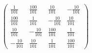\[ \left(\begin{array}{cccc}  \frac{ 1 }{101}  &  \frac{ 100 }{ 101 }
&  \frac{ 10 }{ 101 }  &  -\frac{ 10 }{ 101 }  \\  \frac{ 100 }{ 101 }
&  \frac{ 1 }{101}  &  -\frac{ 10 }{ 101 }  &  \frac{ 10 }{ 101 }  \\
\frac{ 10 }{ 101 }  &  -\frac{ 10 }{ 101 }  &  \frac{ 100 }{ 101 }  &
\frac{ 1 }{101}  \\  -\frac{ 10 }{ 101 }  &  \frac{ 10 }{ 101 }  &
\frac{ 1 }{101}  &  \frac{ 100 }{ 101 }  \end{array}\right) \]
